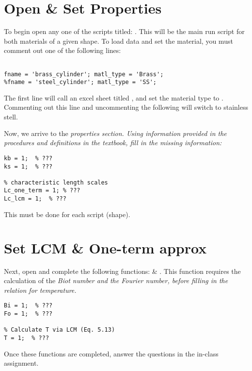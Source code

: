 \documentclass[11pt, letterpaper]{article}
\begin{document}
\section{Open \& Set Properties}

To begin open any one of the scripts titled: . This will be the main run script for both materials of a given shape. To load data and set the material, you must comment out one of the following lines:

\begin{lstlisting}[numbers=none]
%% =================    SETUP    ==================

fname = 'brass_cylinder'; matl_type = 'Brass';
%fname = 'steel_cylinder'; matl_type = 'SS';

\end{lstlisting}

The first line will call an excel sheet titled , and set the material type to . Commenting out this line and uncommenting the following will switch to stainless stell.

Now, we arrive to the \it{properties} section. 
\n
\textcolor{dkred}{} \it{Using information provided in the procedures and definitions in the textbook, fill in the missing information:}

\n
\begin{lstlisting}[numbers=none]
% thermal conductivity
kb = 1;  % ???
ks = 1;  % ???

% characteristic length scales
Lc_one_term = 1; % ???
Lc_lcm = 1;  % ???

\end{lstlisting}

This must be done for each script (shape).

\section{Set LCM \& One-term approx}

Next, open and complete the following functions:  \& . This function requires the calculation of the \it{Biot} number and the \it{Fourier} number, before filling in the relation for temperature.

\n
\begin{lstlisting}[numbers=none]
% Set Bi / Fo
Bi = 1;  % ???
Fo = 1;  % ???

% Calculate T via LCM (Eq. 5.13)
T = 1;  % ???
\end{lstlisting}

Once these functions are completed, answer the questions in the in-class assignment.
\end{document}
